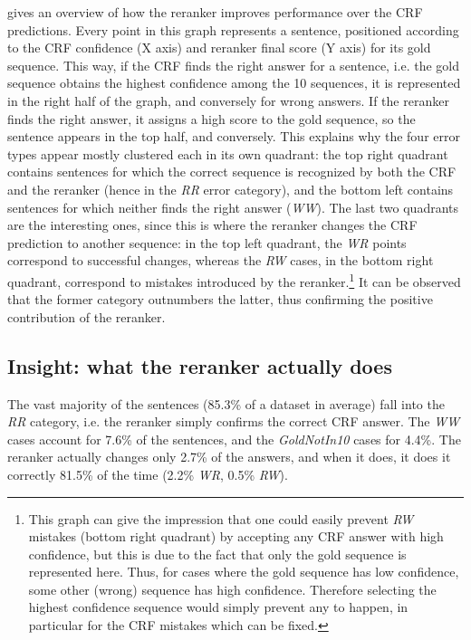 \documentclass[output=paper
,modfonts
,nonflat]{langsci/langscibook}
\begin{document}
 gives an overview of how
the reranker improves performance over the CRF predictions. Every
point in this graph represents a sentence, positioned according to the
CRF confidence (X axis) and reranker final score (Y axis) for its gold
sequence. This way, if the CRF finds the right answer for a sentence,
i.e. the gold sequence obtains the highest confidence among the 10
sequences, it is represented in the right half of the graph, and
conversely for wrong answers. If the reranker finds the right answer,
it assigns a high score to the gold sequence, so the sentence appears
in the top half, and conversely. This explains why the four error
types appear mostly clustered each in its own quadrant: the top right
quadrant contains sentences for which the correct sequence is
recognized by both the CRF and the reranker (hence in the {\it RR}
error category), and the bottom left contains sentences for which
neither finds the right answer ({\it WW}). The last two quadrants are
the interesting ones, since this is where the reranker changes the CRF
prediction to another sequence: in the top left quadrant, the {\it WR} points
correspond to successful changes, whereas the {\it RW} cases, in the
bottom right quadrant, correspond to mistakes introduced by the
reranker.\footnote{This graph can give the impression that one could
  easily prevent {\it RW} mistakes (bottom right quadrant) by
  accepting any CRF answer with high confidence, but this is due to
  the fact that only the gold sequence is represented here. Thus, for
  cases where the gold sequence has low confidence, some other (wrong)
  sequence has high confidence. Therefore selecting the highest
  confidence sequence would simply prevent any  to happen, in
  particular for the CRF mistakes which can be fixed.} It can be
observed that the former category outnumbers the latter, thus
confirming the positive contribution of the reranker.





\subsection{Insight: what the reranker actually does}

The vast majority of the sentences (85.3\% of a dataset in average)
fall into the {\em RR} category, i.e. the reranker simply confirms the
correct CRF answer. The {\em WW} cases account for 7.6\% of the sentences, and
the {\em GoldNotIn10} cases for 4.4\%. The reranker actually changes
only 2.7\% of the answers, and when it does, it does it correctly
81.5\% of the time (2.2\% {\em WR}, 0.5\% {\em RW}).
\end{document}
